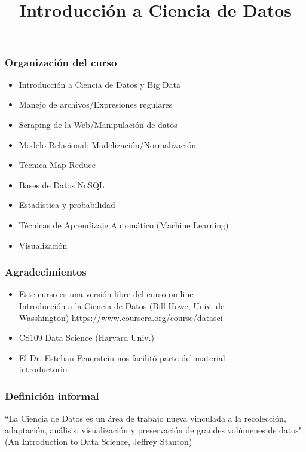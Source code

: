 \documentclass{beamer}
\title[Ciencia de Datos]{\\\large{Introducci\'on a Ciencia de Datos}}
\date[DLT 2003]{}
\begin{document}

\frame{\titlepage}

\begin {frame}
\frametitle{Organizaci\'on del curso}
	\begin{itemize}
	\item Introducci\'on a Ciencia de Datos y Big Data
	\item Manejo de archivos/Expresiones regulares
	\item Scraping de la Web/Manipulación de datos
	\item Modelo Relacional: Modelización/Normalización
	\item Técnica Map-Reduce
	\item Bases de Datos NoSQL
	\item Estadística y probabilidad
	\item Técnicas de Aprendizaje Automático (Machine Learning)
	\item Visualización
	\end{itemize}

\end{frame}

\begin {frame}

\frametitle{Agradecimientos}
\begin{itemize}
	\item Este curso es una versi\'on libre del curso on-line \\
			Introducci\'on a la Ciencia de Datos (Bill Howe, Univ. de \\
			Wasshington) \href{url}{https://www.coursera.org/course/datasci}
	\item CS109 Data Science (Harvard Univ.)
	\item El Dr. Esteban Feuerstein nos facilit\'o parte del material \\
			introductorio
			
\end{itemize}
\end{frame}

\begin {frame}
\frametitle{Definici\'on informal}

``La Ciencia de Datos es un \'area de trabajo nueva vinculada a la 
recolecci\'on, adaptaci\'on, an\'alisis, visualizaci\'on y 
preservaci\'on de grandes vol\'umenes de datos" (An Introduction to 
Data Science, Jeffrey Stanton)

\end{frame}
\end{document}
